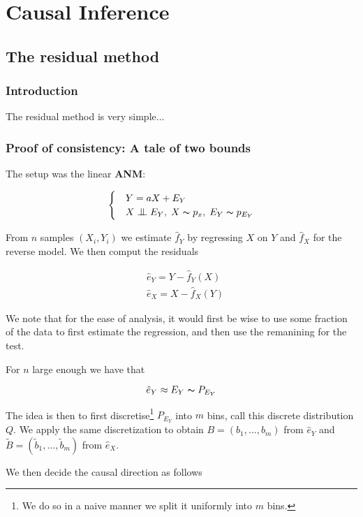 
\chapter{Causal Inference}


\section{The residual method}

\subsection{Introduction}

The residual method is very simple...


\subsection{Proof of consistency: A tale of two bounds}

The setup was the linear \textbf{ANM}:

\[ \begin{cases} 
    & Y = aX + E_Y  \\
    & X \bigCI E_Y,\; X \thicksim p_x,\; E_Y \thicksim p_{E_Y}  
 \end{cases}
\]

From $n$ samples $(X_i, Y_i)$ we estimate $\hat{f}_Y$ by regressing $X$ on $Y$ and 
$\hat{f}_X$ for the reverse model. We then comput the residuals

\begin{align}
    &  \hat{e}_Y = Y - \hat{f}_Y(X)\\
    &  \hat{e}_X = X - \hat{f}_X(Y)
\end{align}

We note that for the ease of analysis, it would first be wise to use some fraction 
of the data to first estimate the regression, and then use the remanining for the test.

For $n$ large enough we have that 

$$
    \hat{e}_Y \approx E_Y \thicksim P_{E_Y}
$$

The idea is then to first discretise\footnote{We do so in a naive manner we split
it uniformly into $m$ bins.} $P_{E_Y}$ into $m$ bins, call this discrete distribution
$Q$. We apply the same discretization to obtain $B = (b_1, ..., b_m)$ from $\hat{e}_Y$
and $\tilde{B} = (\tilde{b}_1, ..., \tilde{b}_m)$ from $\hat{e}_X$.

We then decide the causal direction as follows

